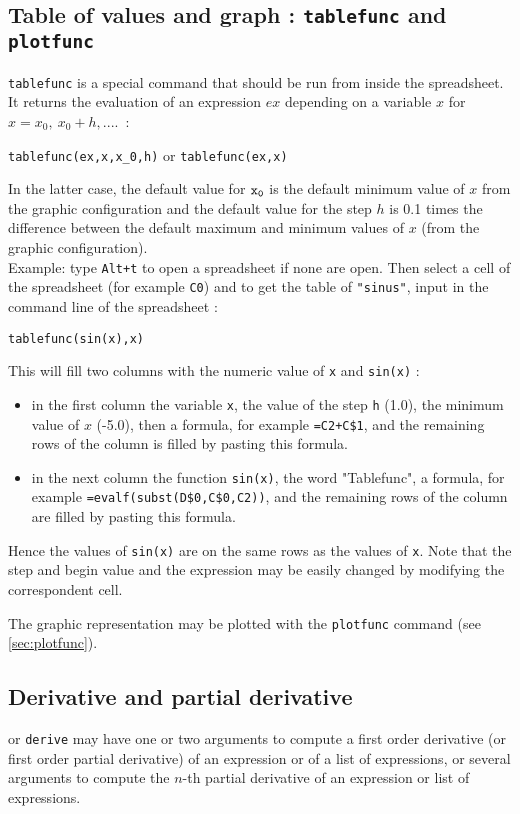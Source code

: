 \documentclass[a4paper,11pt]{book}
\begin{document}
\subsection{Table of values and graph : {\tt tablefunc} and {\tt plotfunc}}   
{\tt tablefunc} is a special command that should be run from inside
the spreadsheet. It returns the evaluation of an expression $ex$ 
depending on a variable $x$ for $x=x_0,\ x_0+h,....$~:
\begin{center}
{\tt tablefunc(ex,x,x\_0,h)} or {\tt tablefunc(ex,x)}
\end{center}
In the latter case, the default value for ${\tt x_0}$
is the default minimum value of $x$ from the graphic configuration
and the default value for the step $h$ is 0.1 times the difference
between the default maximum and minimum values of $x$ (from the
graphic configuration).\\
Example: type {\tt Alt+t} to open a spreadsheet if none are open.
Then select a cell of the spreadsheet (for example {\tt C0}) and to get
the table of {\tt "sinus"}, input in the command line of the spreadsheet : 
\begin{center}{\tt tablefunc(sin(x),x)}\end{center}
This will fill two columns with the numeric value of {\tt x} and 
{\tt sin(x)} :
\begin{itemize}
\item in the first column the variable {\tt x}, 
the value of the step {\tt h}
(1.0),  the minimum value of $x$ (-5.0), then a formula, for example 
{\tt=C2+C\$1}, and the remaining rows 
of the column is filled by pasting this formula.
\item in the next column the function {\tt sin(x)}, the word
"Tablefunc", a formula, 
for example {\tt =evalf(subst(D\$0,C\$0,C2))}, and the remaining rows
of the column are filled by pasting this formula.
\end{itemize}
Hence the values of {\tt sin(x)} are on the same rows as the values 
of {\tt x}. Note that the step and begin value and the expression 
may be easily changed by modifying the correspondent cell.

The graphic representation may be plotted with the {\tt plotfunc} command 
(see \ref{sec:plotfunc}).

\subsection{Derivative and partial derivative}
 or {\tt derive} may have one or two arguments 
to compute a first order derivative (or first order partial
derivative) of an expression or of a list of expressions, 
or several arguments to compute 
the $n$-th partial derivative of an expression or list of expressions.
\end{document}
